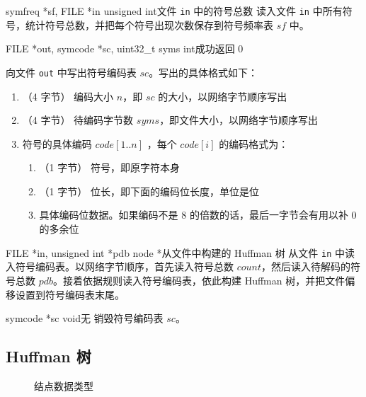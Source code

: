 {symfreq *sf, FILE *in}
{unsigned int}{文件 {\tt in} 中的符号总数}
{读入文件 {\tt in} 中所有符号，统计符号总数，并把每个符号出现次数保存到符号频率表 $sf$ 中。}

{FILE *out, symcode *sc, uint32\_t syms}
{int}{成功返回 0}
{向文件 {\tt out} 中写出符号编码表 $sc$。写出的具体格式如下：
\begin{enumerate}[topsep=0pt,partopsep=0pt,itemsep=0pt,parsep=0pt]
  \item （4 字节） 编码大小 $n$，即 $sc$ 的大小，以网络字节顺序写出
  \item （4 字节） 待编码字节数 $syms$，即文件大小，以网络字节顺序写出
  \item 符号的具体编码 $code[1..n]$ ，每个 $code[i]$ 的编码格式为：
  \begin{enumerate}[topsep=0pt,partopsep=0pt,itemsep=0pt,parsep=0pt]
    \item （1 字节） 符号，即原字符本身
    \item （1 字节） 位长，即下面的编码位长度，单位是位
    \item 具体编码位数据。如果编码不是 8 的倍数的话，最后一字节会有用以补 0 的多余位
  \end{enumerate}
\end{enumerate}
}

{FILE *in, unsigned int *pdb}
{node *}{从文件中构建的 Huffman 树}
{从文件 {\tt in} 中读入符号编码表。以网络字节顺序，首先读入符号总数 $count$，然后读入待解码的符号总数 $pdb$。接着依据规则读入符号编码表，依此构建 Huffman 树，并把文件偏移设置到符号编码表末尾。}

{symcode *sc}
{void}{无}
{销毁符号编码表 $sc$。}

\subsection{Huffman 树}

\begin{figure}[htp]
\centering
{}
\caption{\label{node}结点数据类型}
\end{figure}

